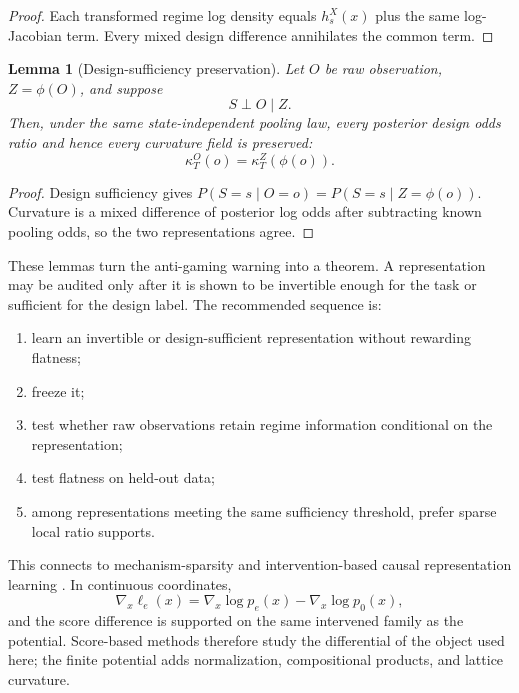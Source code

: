\documentclass[11pt]{article}
\newtheorem{lemma}[theorem]{Lemma}
\begin{document}
\begin{proof}
Each transformed regime log density equals \(h_s^X(x)\) plus the same log-Jacobian term.  Every mixed design difference annihilates the common term.
\end{proof}

\begin{lemma}[Design-sufficiency preservation]
\label{lem:sufficiency-preservation}
Let \(O\) be raw observation, \(Z=\phi(O)\), and suppose
\begin{equation}
S\perp O\mid Z.
\end{equation}
Then, under the same state-independent pooling law, every posterior design odds ratio and hence every curvature field is preserved:
\begin{equation}
\kappa_T^O(o)=\kappa_T^Z(\phi(o)).
\end{equation}
\end{lemma}

\begin{proof}
Design sufficiency gives \(P(S=s\mid O=o)=P(S=s\mid Z=\phi(o))\).  Curvature is a mixed difference of posterior log odds after subtracting known pooling odds, so the two representations agree.
\end{proof}

These lemmas turn the anti-gaming warning into a theorem.  A representation may be audited only after it is shown to be invertible enough for the task or sufficient for the design label.  The recommended sequence is:
\begin{enumerate}
\item learn an invertible or design-sufficient representation without rewarding flatness;
\item freeze it;
\item test whether raw observations retain regime information conditional on the representation;
\item test flatness on held-out data;
\item among representations meeting the same sufficiency threshold, prefer sparse local ratio supports.
\end{enumerate}

This connects to mechanism-sparsity and intervention-based causal representation learning \citep{lachapelle2022sparsity,ahuja2023icrl,vonkugelgen2023nonparametric,varici2025score}.  In continuous coordinates,
\begin{equation}
\nabla_x\ell_e(x)=\nabla_x\log p_e(x)-\nabla_x\log p_0(x),
\end{equation}
and the score difference is supported on the same intervened family as the potential.  Score-based methods therefore study the differential of the object used here; the finite potential adds normalization, compositional products, and lattice curvature.
\end{document}
